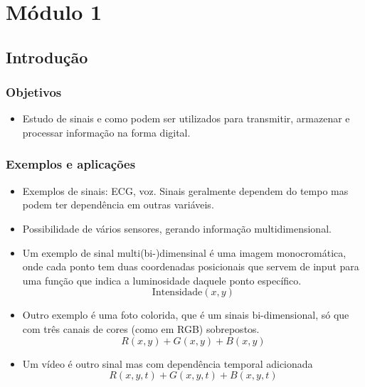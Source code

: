 \chapter{Módulo 1}

\section{Introdução}
\subsection{Objetivos}

\begin{itemize}
    \item Estudo de sinais e como podem ser utilizados para transmitir, armazenar e processar informação na forma digital.
\end{itemize}

\subsection{Exemplos e aplicações}
\begin{itemize}
    \item Exemplos de sinais: ECG, voz. Sinais geralmente dependem do tempo mas podem ter dependência em outras variáveis.
    \item Possibilidade de vários sensores, gerando informação multidimensional.
    \item Um exemplo de sinal multi(bi-)dimensinal é uma imagem monocromática, onde cada ponto tem duas coordenadas posicionais que servem de input para uma função que indica a luminosidade daquele ponto específico.
    \[\text{Intensidade}(x, y)\]
    \item Outro exemplo é uma foto colorida, que é um sinais bi-dimensional, só que com três canais de cores (como em RGB) sobrepostos.
    \[R(x,y) + G(x, y) + B(x, y)\]
    \item Um vídeo é outro sinal mas com dependência temporal adicionada
    \[R(x, y, t) + G(x, y, t) + B(x, y, t)\]
\end{itemize}

